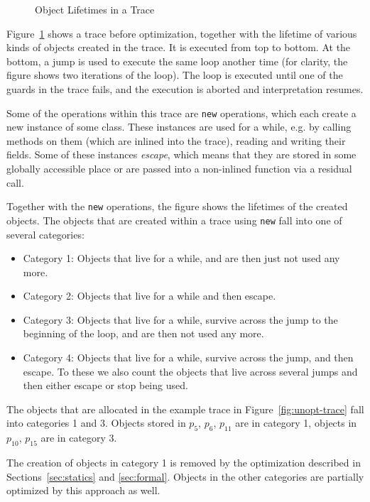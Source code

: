 \documentclass[preprint]{sigplanconf}
\begin{document}
\begin{figure}
\caption{Object Lifetimes in a Trace}
\label{fig:lifetimes}
\end{figure}

Figure~\ref{fig:lifetimes} shows a trace before optimization, together with the
lifetime of various kinds of objects created in the trace. It is executed from
top to bottom. At the bottom, a jump is used to execute the same loop another
time (for clarity, the figure shows two iterations of the loop). The loop is
executed until one of the guards in the trace fails, and the execution is
aborted and interpretation resumes.

Some of the operations within this trace are \lstinline{new} operations, which each
create a new instance of some class. These instances are used for a while, e.g.
by calling methods on them (which are inlined into the trace), reading and
writing their fields. Some of these instances \emph{escape}, which means that
they are stored in some globally accessible place or are passed into a
non-inlined function via a residual call.

Together with the \lstinline{new} operations, the figure shows the lifetimes of the
created objects. The objects that are created within a trace using \lstinline{new}
fall into one of several categories:

\begin{itemize}
    \item Category 1: Objects that live for a while, and are then just not
    used any more.

    \item Category 2: Objects that live for a while and then escape.

    \item Category 3: Objects that live for a while, survive across the jump to
    the beginning of the loop, and are then not used any more.

    \item Category 4: Objects that live for a while, survive across the jump,
    and then escape. To these we also count the objects that live across several
    jumps and then either escape or stop being used.
\end{itemize}

The objects that are allocated in the example trace in
Figure~\ref{fig:unopt-trace} fall into categories 1 and 3. Objects stored in
$p_{5}$, $p_{6}$, $p_{11}$ are in category 1, objects in $p_{10}$, $p_{15}$ are in
category 3.

The creation of objects in category 1 is removed by the optimization described
in Sections~\ref{sec:statics} and \ref{sec:formal}. Objects in the other
categories are partially optimized by this approach as well.
\end{document}
